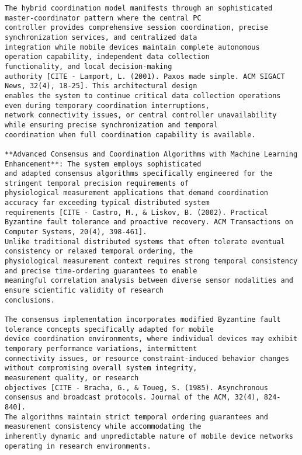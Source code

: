 \documentclass[12pt,a4paper]{report}
\begin{document}
\begin{verbatim}
The hybrid coordination model manifests through an sophisticated master-coordinator pattern where the central PC
controller provides comprehensive session coordination, precise synchronization services, and centralized data
integration while mobile devices maintain complete autonomous operation capability, independent data collection
functionality, and local decision-making
authority [CITE - Lamport, L. (2001). Paxos made simple. ACM SIGACT News, 32(4), 18-25]. This architectural design
enables the system to continue critical data collection operations even during temporary coordination interruptions,
network connectivity issues, or central controller unavailability while ensuring precise synchronization and temporal
coordination when full coordination capability is available.

**Advanced Consensus and Coordination Algorithms with Machine Learning Enhancement**: The system employs sophisticated
and adapted consensus algorithms specifically engineered for the stringent temporal precision requirements of
physiological measurement applications that demand coordination accuracy far exceeding typical distributed system
requirements [CITE - Castro, M., & Liskov, B. (2002). Practical Byzantine fault tolerance and proactive recovery. ACM Transactions on Computer Systems, 20(4), 398-461].
Unlike traditional distributed systems that often tolerate eventual consistency or relaxed temporal ordering, the
physiological measurement context requires strong temporal consistency and precise time-ordering guarantees to enable
meaningful correlation analysis between diverse sensor modalities and ensure scientific validity of research
conclusions.

The consensus implementation incorporates modified Byzantine fault tolerance concepts specifically adapted for mobile
device coordination environments, where individual devices may exhibit temporary performance variations, intermittent
connectivity issues, or resource constraint-induced behavior changes without compromising overall system integrity,
measurement quality, or research
objectives [CITE - Bracha, G., & Toueg, S. (1985). Asynchronous consensus and broadcast protocols. Journal of the ACM, 32(4), 824-840].
The algorithms maintain strict temporal ordering guarantees and measurement consistency while accommodating the
inherently dynamic and unpredictable nature of mobile device networks operating in research environments.


\end{verbatim}
\end{document}
